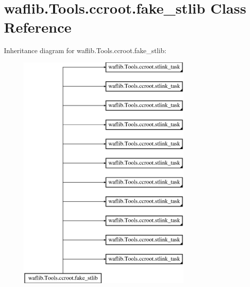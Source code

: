 \hypertarget{classwaflib_1_1_tools_1_1ccroot_1_1fake__stlib}{}\section{waflib.\+Tools.\+ccroot.\+fake\+\_\+stlib Class Reference}
\label{classwaflib_1_1_tools_1_1ccroot_1_1fake__stlib}
Inheritance diagram for waflib.\+Tools.\+ccroot.\+fake\+\_\+stlib\+:\begin{figure}[H]
\begin{center}
\leavevmode
\includegraphics[height=12.000000cm]{classwaflib_1_1_tools_1_1ccroot_1_1fake__stlib}
\end{center}
\end{figure}

